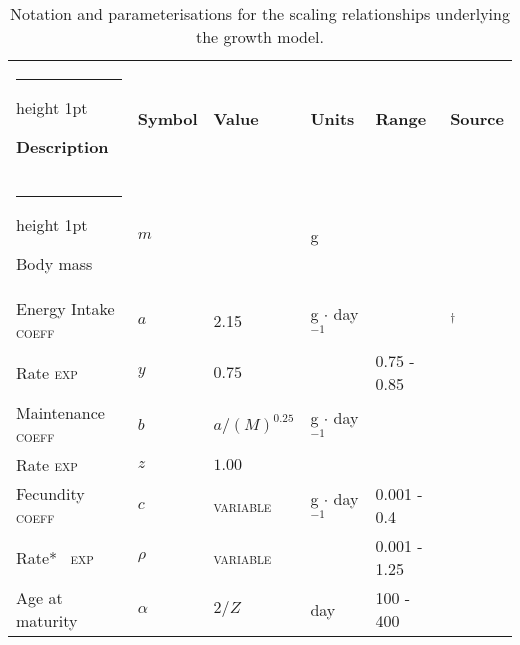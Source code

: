 \documentclass[a4paper]{article} %
\makeatletter
\newcommand{\thickhline}{%
    \noalign {\ifnum 0=`}\fi \hrule height 1pt
    \futurelet \reserved@a \@xhline
}
\makeatother
\begin{document}
\begin{table}[h]
    \caption{Notation and parameterisations for the scaling relationships underlying the growth model.}
    \begin{tabularx}{\linewidth}{Xlllll}
    \thickhline
    \textbf{Description}                                    & \textbf{Symbol}       & \textbf{Value}            & \textbf{Units}        & \textbf{Range}                    & \textbf{Source}       \\ \thickhline
    Body mass                                               & $m$                   &                           & g                     &                                   &                       \\ \hline
    Energy Intake  \qquad      \textsc{coeff}                & $a$                   & 2.15                       & g $\cdot$ day$^{-1}$  &                       & \textcite{West2001}$^{\dagger}$       \\ 
    Rate           \qquad\qquad\quad\quad      \textsc{exp}   & $y$                   & $0.75$                    & \textsc{}             & 0.75 - 0.85                       & \textcite{Pawar2012}      \\ \hline
    Maintenance   \; \qquad \textsc{coeff}                     & $b$                   & $a/(M)^{0.25}$            & g $\cdot$ day$^{-1}$  &                                   & \textcite{West2001}       \\ 
    Rate           \qquad\qquad\quad\quad    \textsc{exp}     & $z$                   & $1.00$                    & \textsc{}             &                                   &                       \\ \hline
    Fecundity   \; \; \; \quad\quad\textsc{coeff}                         & $c$                   & \textsc{variable}         & g $\cdot$ day$^{-1}$  & 0.001 - 0.4                       & \textcite{Charnov2001}    \\  %
    Rate*       \; \; \ \quad\quad\quad\quad       \textsc{exp}     & $\rho$                & \textsc{variable}         & \textsc{}             & 0.001 - 1.25                      & \textcite{Barneche2018-reproductive_output}                      \\ \hline %
    Age at maturity                                         & $\alpha$              & $2/Z$                     & day                   & 100 - 400                         &                       \\ \hline

\end{tabularx}
\end{table}
\end{document}
